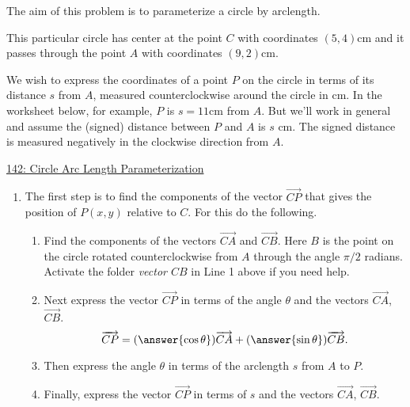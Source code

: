 \documentclass{ximera}
\begin{document}
\begin{question} \label{QWEercfe341}

The aim of this problem is to parameterize a circle by arclength.

This particular circle has center at the point $C$ with coordinates $(5,4)$cm and it passes through the point $A$ with coordinates $(9,2)$cm. 

We wish to express the coordinates of a point $P$ on the circle in terms of its distance $s$ from $A$, measured counterclockwise around the circle in cm. In the worksheet below, for example, $P$ is $s=11$cm from $A$. But we'll work in general and assume the (signed) distance between $P$ and $A$ is $s$ cm. The signed distance is measured negatively in the clockwise direction from $A$.

\begin{onlineOnly}
    \begin{center}
\end{center}
\end{onlineOnly}

\href{https://www.desmos.com/calculator/kuwm2chgyu}{142: Circle Arc Length Parameterization}


\begin{expandable}

\begin{enumerate}
\item The first step is to find the components of the vector $\overrightarrow{CP}$ that gives the position of $P(x,y)$ relative to $C$. For this do the following.

\begin{enumerate}
\item Find the components of the vectors $\overrightarrow{CA}$ and $\overrightarrow{CB}$.  Here $B$ is the point on the circle rotated counterclockwise from $A$ through the angle $\pi/2$ radians. Activate the folder \emph{vector $CB$} in Line 1 above if you need help.

\item Next express the vector $\overrightarrow{CP}$ in terms of the angle $\theta$ and the vectors $\overrightarrow{CA}$, $\overrightarrow{CB}$.
\[
       \overrightarrow{CP} = (\answer{\cos \theta}) \overrightarrow{CA} + (\answer{\sin \theta}) \overrightarrow{CB} .
\]

\item Then express the angle $\theta$ in terms of the arclength $s$ from $A$ to $P$.

\item Finally, express  the vector $\overrightarrow{CP}$ in terms of $s$ and the vectors $\overrightarrow{CA}$, $\overrightarrow{CB}$.


\end{enumerate}
\end{enumerate}
\end{expandable}
\end{question}
\end{document}
